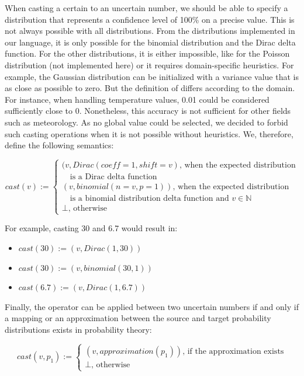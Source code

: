 When casting a certain to an uncertain number, we should be able to specify a distribution that represents a confidence level of 100\% on a precise value.
This is not always possible with all distributions.
From the distributions implemented in our language, it is only possible for the binomial distribution and the Dirac delta function.
For the other distributions, it is either impossible, like for the Poisson distribution (not implemented here) or it requires domain-specific heuristics.
For example, the Gaussian distribution can be initialized with a variance value that is as close as possible to zero.
But the definition of  differs according to the domain. 
For instance, when handling temperature values, 0.01 could be considered sufficiently close to 0.
Nonetheless, this accuracy is not sufficient for other fields such as meteorology.
As no global value could be selected, we decided to forbid such casting operations when it is not possible without heuristics.
We, therefore, define the following semantics:

$$cast(v) := \begin{cases}
						(v, Dirac(coeff=1, shift=v) \text{, when the expected distribution} \\
						\text{~~ is a Dirac delta function}\\
						(v, binomial(n=v, p=1)) \text{, when the expected distribution}\\
						\text{~~ is a binomial distribution delta function and $v \in \mathds{N}$}\\
						\perp \text{, otherwise}
					\end{cases}$$

For example, casting 30 and 6.7 would result in:
\begin{itemize}
	\item $cast(30) := (v, Dirac(1, 30))$
	\item $cast(30) := (v, binomial(30, 1))$
	\item $cast(6.7) := (v, Dirac(1, 6.7))$
\end{itemize}

Finally, the operator can be applied between two uncertain numbers if and only if a mapping or an approximation  between the source and target probability distributions exists in probability theory:

$$cast(v, p_1) := \begin{cases}
 								(v, approximation(p_1)) \text{, if the approximation exists}\\
 								\perp \text{, otherwise}
 							\end{cases}$$


